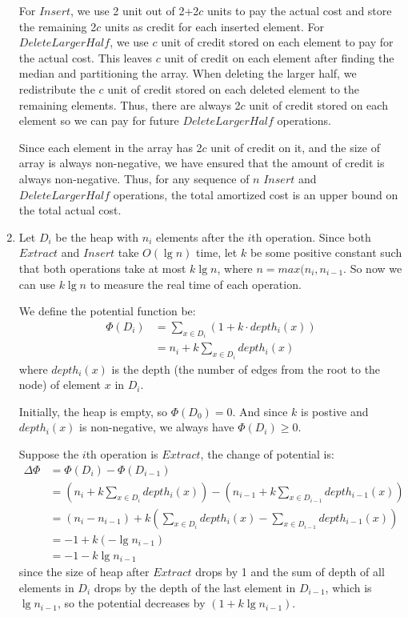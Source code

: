 \documentclass[11pt]{article}
\begin{document}
\begin{enumerate}
For $Insert$, we use 2 unit out of 2+2$c$ units to pay the actual cost and
store the remaining 2$c$ units as credit for each inserted element. For
$DeleteLargerHalf$, we use $c$ unit of credit stored on each element to pay for
the actual cost. This leaves $c$ unit of credit on each element after finding
the median and partitioning the array. When deleting the larger half,
we redistribute the $c$ unit of credit stored on each deleted element to the
remaining elements. Thus, there are always 2$c$ unit of credit stored on each
element so we can pay for future $DeleteLargerHalf$ operations.

Since each element in the array has 2$c$ unit of credit on it, and the
size of array is always non-negative, we have ensured that the amount
of credit is always non-negative. Thus, for any sequence of $n$
$Insert$ and $DeleteLargerHalf$ operations, the total amortized cost
is an upper bound on the total actual cost. 

\item %
  Let $D_i$ be the heap with $n_i$ elements after the $i$th
  operation. Since both $Extract$ and $Insert$ take $O(\lg n)$ time,
  let $k$ be some positive constant such that both operations take at most
  $k\lg n$, where $n = max(n_i, n_{i-1}$. So now we can use $k\lg n$
  to measure the real time of each operation.

  We define the potential function be:
  \begin{align}
    \Phi(D_i) &= \sum_{x \in D_i} (1 + k \cdot depth_i(x))\\
    &= n_i + k\sum_{x \in D_i} depth_i(x)
  \end{align}
  where $depth_i(x)$ is the depth (the number of edges from the root
  to the node) of element $x$ in $D_i$.

  Initially, the heap is empty, so $\Phi(D_0) = 0$. And since $k$ is
  postive and $depth_i(x)$ is non-negative, we always have $\Phi(D_i)
  \geq 0$. 

  Suppose the $i$th operation is $Extract$, the change of potential is:
  \begin{align}
    \Delta\Phi &= \Phi(D_i) - \Phi(D_{i-1})\\
    &= (n_i + k\sum_{x \in D_i} depth_i(x)) - (n_{i-1} + k\sum_{x \in
      D_{i-1}} depth_{i-1}(x)) \\
    &= (n_i - n_{i-1}) + k(\sum_{x \in D_i}depth_i(x) - \sum_{x \in
      D_{i-1}}depth_{i-1}(x))\\
    &= -1 + k(-\lg n_{i-1})\\
    &= -1 - k\lg n_{i-1}
  \end{align}
  since the size of heap after $Extract$ drops by 1 and the sum of
  depth of all elements in $D_i$ drops by the depth of the last
  element in $D_{i-1}$, which is $\lg n_{i-1}$, so the potential
  decreases by $(1 + k\lg n_{i-1})$. 
  

\end{enumerate}
\end{document}
